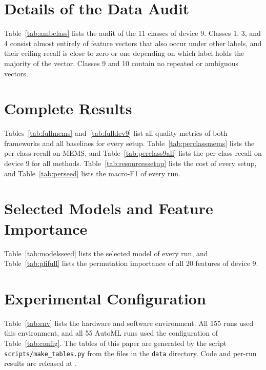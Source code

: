 \appendices
\section{Details of the Data Audit}\label{app:audit}
Table~\ref{tab:ambclass} lists the audit of the 11 classes of device 9. Classes 1, 3, and 4 consist almost entirely of feature vectors that also occur under other labels, and their ceiling recall is close to zero or one depending on which label holds the majority of the vector. Classes 9 and 10 contain no repeated or ambiguous vectors.


\section{Complete Results}\label{app:results}
Tables~\ref{tab:fullmems} and~\ref{tab:fulldev9} list all quality metrics of both frameworks and all baselines for every setup. Table~\ref{tab:perclassmems} lists the per-class recall on MEMS, and Table~\ref{tab:perclass9all} lists the per-class recall on device 9 for all methods. Table~\ref{tab:resourcessetup} lists the cost of every setup, and Table~\ref{tab:perseed} lists the macro-F1 of every run.







\section{Selected Models and Feature Importance}\label{app:models}
Table~\ref{tab:modelsseed} lists the selected model of every run, and Table~\ref{tab:pfifull} lists the permutation importance of all 20 features of device 9.



\section{Experimental Configuration}\label{app:config}
Table~\ref{tab:env} lists the hardware and software environment. All 155 runs used this environment, and all 55 AutoML runs used the configuration of Table~\ref{tab:config}. The tables of this paper are generated by the script \texttt{scripts/make\_tables.py} from the files in the \texttt{data} directory. Code and per-run results are released at .

